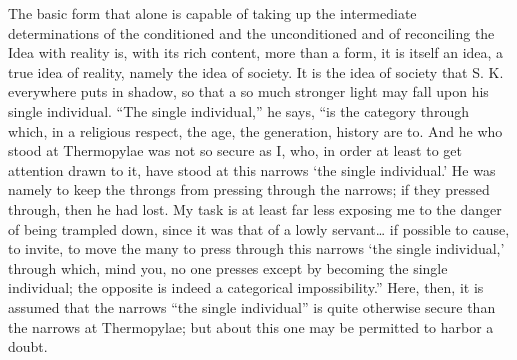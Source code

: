 \documentclass[12pt,a4paper,openany]{book}
\newcommand{\opage}[1]{\marginnote{\footnotesize\textit{[#1]}}}
\begin{document}
The basic form that alone is capable of taking up
the intermediate determinations of the conditioned and the unconditioned
and of reconciling the Idea with reality is, with its
rich content, more than a form, it is itself an idea,
a true idea of reality, namely the idea of society. It
is the idea of society that S. K. everywhere puts in shadow,
so that a so much stronger light may fall upon his single individual.
``The single individual,'' he says, ``is the category through
which, in a religious respect, the age, the generation, history
are to. And he who stood at Thermopylae was
not so secure as I, who, in order at least
to get attention drawn to it, have stood at this narrows `the single individual.'
He was namely to keep the throngs
from pressing through the narrows; if they pressed through,
then he had lost. My task is at least
far less exposing me to the danger of
\setcounter{footnote}{0}%
\opage{28}being trampled down, since it was that of a lowly servant\dots{} if
possible to cause, to invite, to move the many
to press through this narrows `the single individual,'
through which, mind you, no one presses except
by becoming the single individual; the opposite is indeed a categorical
impossibility.'' Here, then, it is assumed that the narrows
``the single individual'' is quite otherwise secure than the narrows
at Thermopylae; but about this one may be permitted
to harbor a doubt.
\end{document}

